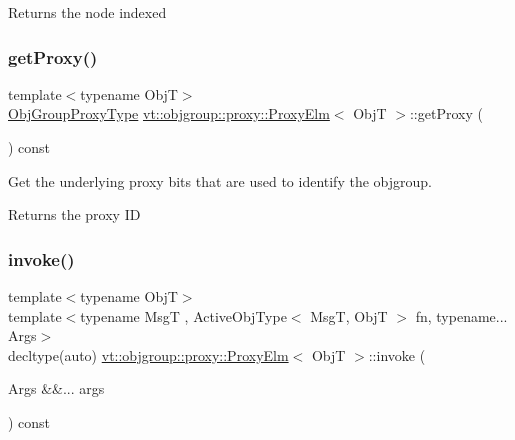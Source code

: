 \begin{DoxyReturn}{Returns}
the node indexed 
\end{DoxyReturn}
\mbox{\label{structvt_1_1objgroup_1_1proxy_1_1_proxy_elm_ae7cbfe997421f265fa51cd29adc6957e}} 
\subsubsection{\texorpdfstring{get\+Proxy()}{getProxy()}}
{\footnotesize\ttfamily template$<$typename ObjT$>$ \\
\hyperlink{namespacevt_ad7cae989df485fccca57f0792a880a8e}{Obj\+Group\+Proxy\+Type} \hyperlink{structvt_1_1objgroup_1_1proxy_1_1_proxy_elm}{vt\+::objgroup\+::proxy\+::\+Proxy\+Elm}$<$ ObjT $>$\+::get\+Proxy (\begin{DoxyParamCaption}{ }\end{DoxyParamCaption}) const\hspace{0.3cm}{\ttfamily [inline]}}



Get the underlying proxy bits that are used to identify the objgroup. 

\begin{DoxyReturn}{Returns}
the proxy ID 
\end{DoxyReturn}
\mbox{\label{structvt_1_1objgroup_1_1proxy_1_1_proxy_elm_a6dcda2aa12a605aceac3a1bba468e16f}} 
\subsubsection{\texorpdfstring{invoke()}{invoke()}\hspace{0.1cm}{\footnotesize\ttfamily [1/2]}}
{\footnotesize\ttfamily template$<$typename ObjT$>$ \\
template$<$typename MsgT , Active\+Obj\+Type$<$ Msg\+T, Obj\+T $>$ fn, typename... Args$>$ \\
decltype(auto) \hyperlink{structvt_1_1objgroup_1_1proxy_1_1_proxy_elm}{vt\+::objgroup\+::proxy\+::\+Proxy\+Elm}$<$ ObjT $>$\+::invoke (\begin{DoxyParamCaption}\item[{Args \&\&...}]{args }\end{DoxyParamCaption}) const}



